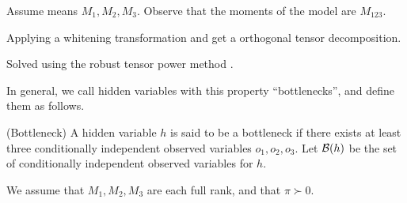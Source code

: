 Assume means $M_1, M_2, M_3$. Observe that the moments of the model are $M_{123}$.

Applying a whitening transformation and get a orthogonal tensor decomposition.

Solved using the robust tensor power method \citet{anandkumar13tensor}.

In general, we call hidden variables with this property ``bottlenecks'',
  and define them as follows.
\begin{definition}(Bottleneck)
  A hidden variable $h$ is said to be a bottleneck if there exists at
  least three conditionally independent observed variables $o_1, o_2,
  o_3$. Let $\mathcal{B}(h)$ be the set of conditionally independent observed
  variables for $h$.
\end{definition}

\begin{assumption}
  We assume that $M_1, M_2, M_3$ are each full rank, and that $\pi \succ
  0$\reword.
\end{assumption}

